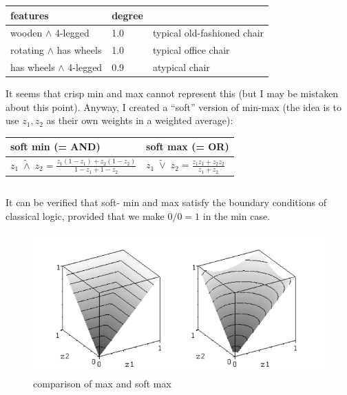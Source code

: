 \hspace*{1cm} \begin{tabular}{|l|l|l|} \hline
\textbf{features}            & \textbf{degree} &\\ \hline
wooden $\wedge$ 4-legged     & 1.0             & typical old-fashioned chair\\
rotating $\wedge$ has wheels & 1.0             & typical office chair\\
has wheels $\wedge$ 4-legged & 0.9             & atypical chair\\
\hline
\end{tabular}

It seems that crisp min and max cannot represent this (but I may be mistaken about this point).  Anyway, I created a ``soft'' version of min-max (the idea is to use $z_1, z_2$ as their own weights in a weighted average):

\hspace*{1cm} \begin{tabular}{|l|l|}
\hline
{\textbf{soft min (= AND)}} & {\textbf{soft max (= OR)}}\\ \hline
\rule[-7mm]{0mm}{16mm} 
$\displaystyle z_1 \; \widetilde{\wedge} \; z_2 = \frac{z_1 (1-z_1) + z_2 (1-z_2)}{1 - z_1 + 1 - z_2} $
& $\displaystyle z_1 \; \widetilde{\vee} \; z_2 = \frac{z_1 z_1 + z_2 z_2}{z_1 + z_2} $ \\
\hline
\end{tabular}
\parbox{4cm}{\begin{equation}
\label{eqn:soft-min-max}
\end{equation}}

It can be verified that soft- min and max satisfy the boundary conditions of classical logic, provided that we make $0/0 = 1$ in the min case.

\begin{figure}[H]
\centering
\includegraphics[scale=0.9]{soft-max.png}
\caption{comparison of max and soft max}
\end{figure}


